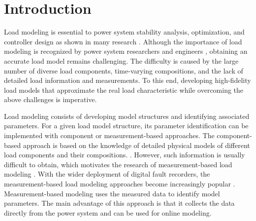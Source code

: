 \documentclass[journal]{IEEEtran}
\begin{document}
	\section{Introduction}
	\label{sec:introduction}
	Load modeling is essential to power system stability analysis, optimization, and controller design as shown in many research \cite{C.W.Taylor1994}. Although the importance of load modeling is recognized by power system researchers and engineers \cite{P.Kundur1994}, obtaining an accurate load model remains challenging. The difficulty is caused by the large number of diverse load components, time-varying compositions, and the lack of detailed load information and measurements. To this end, developing high-fidelity load models that approximate the real load characteristic while overcoming the above challenges is imperative.
	
	Load modeling consists of developing model structures and identifying associated parameters. For a given load model structure, its parameter identification can be implemented with component or measurement-based approaches. The component-based approach is based on the knowledge of detailed physical models of different load components and their compositions. \cite{Wong2012,Kosterev2008}. However, such information is usually difficult to obtain, which motivates the research of measurement-based load modeling \cite{LeeJune2012,Ma2008,Visconti2014,Han2009,Choi2009,Hu2016}. With the wider deployment of digital fault recorders, the measurement-based load modeling approaches become increasingly popular \cite{Choi2009,Ma2008,Son2014,Kim2016,Overbye2012}. Measurement-based modeling uses the measured data to identify model parameters. The main advantage of this approach is that it collects the data directly from the power system and can be used for online modeling.
	
\end{document}
